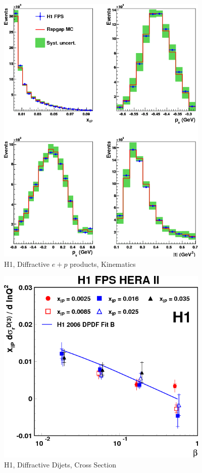 \begin{figure}[h!]
\begin{centering}
\includegraphics[width=4in]{Chapter2/importfigs/d10-095f3.png}
\par\end{centering}
\caption{H1, Diffractive $e+p$ products, Kinematics \cite{Aaron:2010aa} \label{fig:h1Kinematics}}
\end{figure}
 
\begin{figure}[h!]
\begin{centering}
\includegraphics[width=4in]{Chapter2/importfigs/d10-095f15.png}
\par\end{centering}
\caption{H1, Diffractive Dijets, Cross Section \cite{Aaron:2010aa} \label{fig:h1XSec}}
\end{figure}

